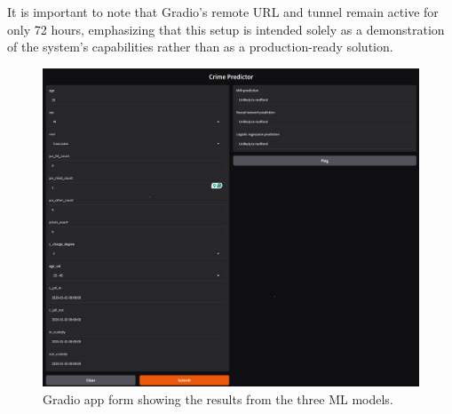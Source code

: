 It is important to note that Gradio’s remote URL and tunnel remain active for only 72 hours, emphasizing that this setup is intended solely as a demonstration of the system’s capabilities rather than as a production-ready solution.

\begin{figure}[H]
	\centering
	\includegraphics[width=0.7\linewidth]{img/gradio-app-page}
	\caption{Gradio app form showing the results from the three ML models.}
	\label{fig:gradio-app-page}
\end{figure}




